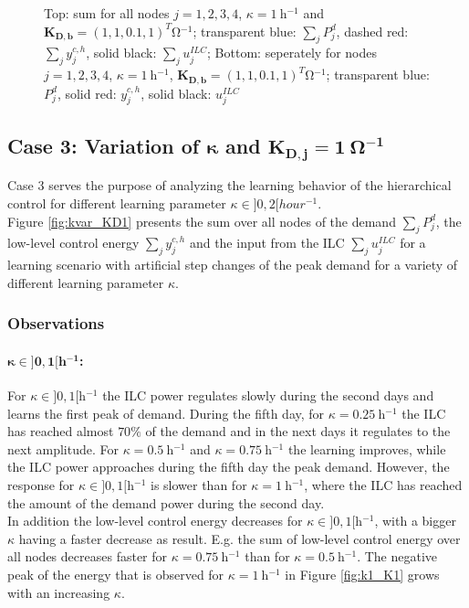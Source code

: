 \begin{figure}[h]
	
	
	\caption{Top: sum for all nodes $j = 1,2,3,4$, $\kappa = \SI{1}{\hour ^{-1}}$ and $\boldsymbol{K_{D,b}} = (1,1,0.1,1)^T\si{\ohm ^{-1}}$; transparent blue: $\sum_{j} P_j^d$, dashed red: $\sum_{j} y_j^{c,h}$, solid black: $\sum_{j}u_j^{ILC}$; Bottom: seperately for nodes $j = 1,2,3,4$, $\kappa = \SI{1}{\hour ^{-1}}$, $\boldsymbol{K_{D,b}} = (1,1,0.1,1)^T\si{\ohm ^{-1}}$; transparent blue: $P_j^d$, solid red: $y_j^{c,h}$, solid black: $u_j^{ILC}$}
	\label{fig:k1_KDb}
\end{figure}
\subsection{Case 3: Variation of  $\boldsymbol{\kappa}$ and $\boldsymbol{K_{D,j}= \SI{1}{\ohm^{-1}}}$}
\label{subsec:case3}
\label{subsec:K_1_kappa_var}
Case 3 serves the purpose of analyzing the learning behavior of the hierarchical control for different learning parameter $\kappa \in ]0,2[ \si{hour^{-1}}$. 
\\Figure \ref{fig:kvar_KD1} presents the sum over all nodes of the demand $\sum_{j}P^d_j$, the low-level control energy $\sum_{j}y^{c,h}_j$ and the input from the ILC $\sum_{j} u^{ILC}_j$ for a learning scenario with artificial step changes of the peak demand for a variety of different learning parameter $\kappa$. 
\subsubsection*{Observations}
\paragraph{$\boldsymbol{\kappa \in ]0,1[\si{\hour^{-1}}}$:}
For $\kappa \in ]0,1[\si{\hour^{-1}}$ the ILC power regulates slowly during the second days and learns the first peak of demand. During the fifth day, for $\kappa = \SI{0.25}{\hour^{-1}}$ the ILC has reached almost $70\%$ of the demand and in the next days it regulates to the next amplitude. For $\kappa = \SI{0.5}{\hour^{-1}}$ and $\kappa = \SI{0.75}{\hour^{-1}}$ the learning improves, while the ILC power approaches during the fifth day the peak demand. However, the response for $\kappa \in ]0,1[\si{\hour^{-1}}$ is slower than for $\kappa = \SI{1}{\hour^{-1}}$, where the ILC has reached the amount of the demand power during the second day. 
\\In addition the low-level control energy decreases for $\kappa \in ]0,1[\si{\hour^{-1}}$, with a bigger $\kappa$ having a faster decrease as result. E.g. the sum of low-level control energy over all nodes decreases faster for $\kappa = \SI{0.75}{\hour^{-1}}$ than for $\kappa = \SI{0.5}{\hour^{-1}}$. The negative peak of the energy that is observed for $\kappa = \SI{1}{\hour^{-1}}$ in Figure \ref{fig:k1_K1} grows with an increasing $\kappa$.
